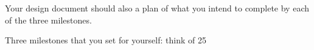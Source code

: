 Your design document should also a plan of what you intend to complete by each of the three milestones.

Three milestones that you set for yourself: think of 25%
